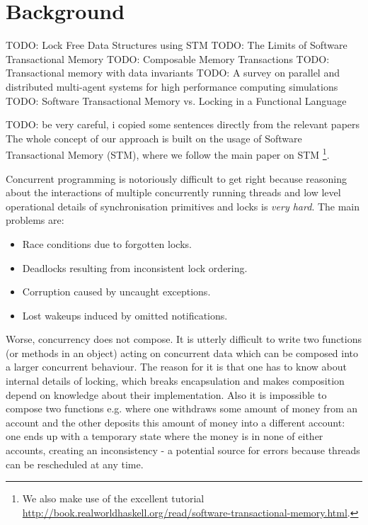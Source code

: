\section{Background}
\label{sec:background}

TODO: Lock Free Data Structures using STM \cite{discolo_lock_2006}
TODO: The Limits of Software Transactional Memory \cite{perfumo_limits_2008}
TODO: Composable Memory Transactions \cite{harris_composable_2005}
TODO: Transactional memory with data invariants \cite{harris_transactional_2006}
TODO: A survey on parallel and distributed multi-agent systems for high performance computing simulations \cite{rousset_survey_2016}
TODO: Software Transactional Memory vs. Locking in a Functional Language \cite{castor_software_2011}

TODO: be very careful, i copied some sentences directly from the relevant papers
The whole concept of our approach is built on the usage of Software Transactional Memory (STM), where we follow the main paper \cite{harris_composable_2005} on STM \footnote{We also make use of the excellent tutorial \url{http://book.realworldhaskell.org/read/software-transactional-memory.html}.}. 

Concurrent programming is notoriously difficult to get right because reasoning about the interactions of multiple concurrently running threads and low level operational details of synchronisation primitives and locks is \textit{very hard}. The main problems are:

\begin{itemize}
	\item Race conditions due to forgotten locks.
	\item Deadlocks resulting from inconsistent lock ordering.
	\item Corruption caused by uncaught exceptions.
	\item Lost wakeups induced by omitted notifications.
\end{itemize}

Worse, concurrency does not compose. It is utterly difficult to write two functions (or methods in an object) acting on concurrent data which can be composed into a larger concurrent behaviour. The reason for it is that one has to know about internal details of locking, which breaks encapsulation and makes composition depend on knowledge about their implementation. Also it is impossible to compose two functions e.g. where one withdraws some amount of money from an account and the other deposits this amount of money into a different account: one ends up with a temporary state where the money is in none of either accounts, creating an inconsistency - a potential source for errors because threads can be rescheduled at any time.

